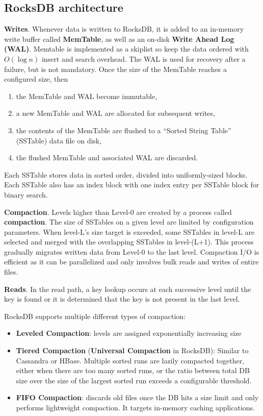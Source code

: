 \documentclass[11pt]{article}
\begin{document}
\subsection{RocksDB architecture}
\label{sec:org61d5af0}
\textbf{Writes}. Whenever data is written to RocksDB, it is added to an in-memory write buffer called \textbf{MemTable}, as well as an
on-disk \textbf{Write Ahead Log (WAL)}. Memtable is implemented as a skiplist so keep the data ordered with \(O(\log n)\) insert and
search overhead. The WAL is used for recovery after a failure, but is not mandatory. Once the size of the MemTable reaches
a configured size, then
\begin{enumerate}
\item the MemTable and WAL become immutable,
\item a new MemTable and WAL are allocated for subsequent writes,
\item the contents of the MemTable are flushed to a “Sorted String Table” (SSTable) data file on disk,
\item the flushed MemTable and associated WAL are discarded.
\end{enumerate}
Each SSTable stores data in sorted order, divided into uniformly-sized blocks. Each SSTable also has an index block
with one index entry per SSTable block for binary search.

\textbf{Compaction}. Levels higher than Level-0 are created by a process called \textbf{compaction}. The size of
SSTables on a given level are limited by configuration parameters. When level-L’s size target is exceeded, some
SSTables in level-L are selected and merged with the overlapping SSTables in level-(L+1). This process
gradually migrates written data from Level-0 to the last level. Compaction I/O is efficient as it can
be parallelized and only involves bulk reads and writes of entire files.

\textbf{Reads}. In the read path, a key lookup occurs at each successive level until the key is found or it is
determined that the key is not present in the last level.

RocksDB supports multiple different types of compaction:
\begin{itemize}
\item \textbf{Leveled Compaction}: levels are assigned exponentially increasing size
\item \textbf{Tiered Compaction} (\textbf{Universal Compaction} in RocksDB): Similar to Cassandra or HBase. Multiple sorted runs are lazily compacted
together, either when there are too many sorted runs, or the ratio between total DB size over the
size of the largest sorted run exceeds a configurable threshold.
\item \textbf{FIFO Compaction}: discards old files once the DB hits a size limit and only performs lightweight
compaction. It targets in-memory caching applications.
\end{itemize}
\end{document}
